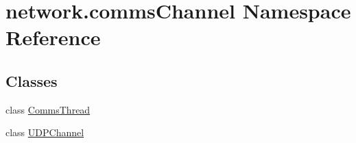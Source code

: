 \hypertarget{namespacenetwork_1_1commsChannel}{}\section{network.\+comms\+Channel Namespace Reference}
\label{namespacenetwork_1_1commsChannel}
\subsection*{Classes}
\begin{DoxyCompactItemize}
\item 
class \hyperlink{classnetwork_1_1commsChannel_1_1CommsThread}{Comms\+Thread}
\item 
class \hyperlink{classnetwork_1_1commsChannel_1_1UDPChannel}{U\+D\+P\+Channel}
\end{DoxyCompactItemize}
